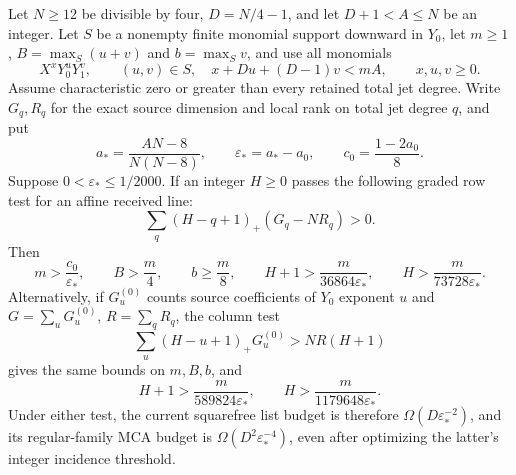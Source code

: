 \begin{theorem}\label{thm:current-graded}
Let $N\ge12$ be divisible by four, $D=N/4-1$, and let $D+1<A\le N$
be an integer. Let $S$ be a nonempty finite monomial support downward in $Y_0$,
let $m\ge1$, $B=\max_S(u+v)$ and $b=\max_S v$, and use all monomials
\[
 X^xY_0^uY_1^v,\qquad
 (u,v)\in S,\quad x+Du+(D-1)v<mA,
 \qquad x,u,v\ge0.
\]
Assume characteristic zero or greater than every retained total jet degree.
Write $G_q,R_q$ for the exact source dimension and local rank on total jet
degree $q$, and put
\[
 a_* =\frac{AN-8}{N(N-8)},\qquad
 \varepsilon_*=a_*-a_0,\qquad c_0=\frac{1-2a_0}{8}.
\]
Suppose $0<\varepsilon_*\le1/2000$. If an integer $H\ge0$ passes the
following graded row test for an affine received line:
\begin{equation}\label{eq:current-graded-test}
 \sum_q(H-q+1)_+(G_q-NR_q)>0.
\end{equation}
Then
\begin{equation}\label{eq:current-graded-costs}
 m>\frac{c_0}{\varepsilon_*},\qquad B>\frac m4,\qquad
 b\ge\frac m8,\qquad
 H+1>\frac{m}{36864\varepsilon_*},\qquad
 H>\frac{m}{73728\varepsilon_*}.
\end{equation}
Alternatively, if $G_u^{(0)}$ counts source coefficients of $Y_0$ exponent $u$
and $G=\sum_uG_u^{(0)}$, $R=\sum_qR_q$, the column test
\[
 \sum_u(H-u+1)_+G_u^{(0)}>NR(H+1)
\]
gives the same bounds on $m,B,b$, and
\[
 H+1>\frac{m}{589824\varepsilon_*},\qquad
 H>\frac{m}{1179648\varepsilon_*}.
\]
Under either test, the current squarefree list budget is therefore
$\Omega(D\varepsilon_*^{-2})$, and its regular-family MCA budget is
$\Omega(D^2\varepsilon_*^{-4})$, even after optimizing the latter's
integer incidence threshold.
\end{theorem}
